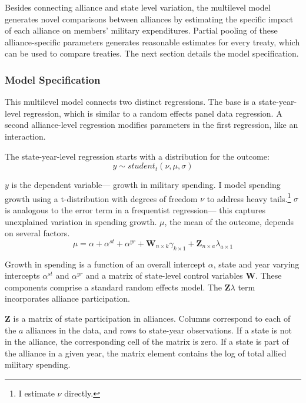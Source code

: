 \documentclass[12pt]{article}
\begin{document}
Besides connecting alliance and state level variation, the multilevel model generates novel comparisons between alliances by estimating the specific impact of each alliance on members' military expenditures. 
Partial pooling of these alliance-specific parameters generates reasonable estimates for every treaty, which can be used to compare treaties. 
The next section details the model specification. 
 


\subsubsection{Model Specification} 

This multilevel model connects two distinct regressions. 
The base is a state-year-level regression, which is similar to a random effects panel data regression.
A second alliance-level regression modifies parameters in the first regression, like an interaction. 


The state-year-level regression starts with a distribution for the outcome:
\begin{equation}
y \sim student_t(\nu, \mu, \sigma)
\end{equation}
 

$y$ is the dependent variable--- growth in military spending. 
I model spending growth using a t-distribution with degrees of freedom $\nu$ to address heavy tails.\footnote{I estimate $\nu$ directly.}
$\sigma$ is analogous to the error term in a frequentist regression--- this captures unexplained variation in spending growth.  
$\mu$, the mean of the outcome, depends on several factors.
\begin{equation}
\mu = \alpha + \alpha^{st} + \alpha^{yr} +\textbf{W}_{n \times k} \gamma_{k \times 1}  + \textbf{Z}_{n \times a} \lambda_{a \times 1} 
\end{equation}


Growth in spending is a function of an overall intercept $\alpha$, state and year varying intercepts $\alpha^{st}$ and $\alpha^{yr}$ and a matrix of state-level control variables $\textbf{W}$.
These components comprise a standard random effects model. 
The $\textbf{Z} \lambda$ term incorporates alliance participation.


$\textbf{Z}$ is a matrix of state participation in alliances. 
Columns correspond to each of the $a$ alliances in the data, and rows to state-year observations. 
If a state is not in the alliance, the corresponding cell of the matrix is zero.
If a state is part of the alliance in a given year, the matrix element contains the log of total allied military spending.
\end{document}

